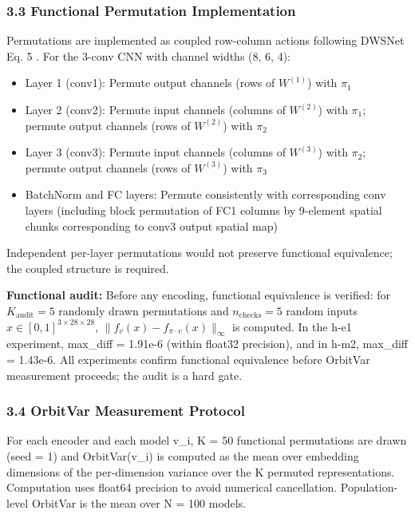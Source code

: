 \subsubsection{3.3 Functional Permutation Implementation}

Permutations are implemented as coupled row-column actions following DWSNet Eq. 5 \citep{Navon2023Equivariant}. For the 3-conv CNN with channel widths (8, 6, 4):

\begin{itemize}
\item Layer 1 (conv1): Permute output channels (rows of $W^{(1)}$) with $\pi_1$
\item Layer 2 (conv2): Permute input channels (columns of $W^{(2)}$) with $\pi_1$; permute output channels (rows of $W^{(2)}$) with $\pi_2$
\item Layer 3 (conv3): Permute input channels (columns of $W^{(3)}$) with $\pi_2$; permute output channels (rows of $W^{(3)}$) with $\pi_3$
\item BatchNorm and FC layers: Permute consistently with corresponding conv layers (including block permutation of FC1 columns by 9-element spatial chunks corresponding to conv3 output spatial map)
\end{itemize}

Independent per-layer permutations would not preserve functional equivalence; the coupled structure is required.

\textbf{Functional audit:} Before any encoding, functional equivalence is verified: for $K_\text{audit} = 5$ randomly drawn permutations and $n_\text{checks} = 5$ random inputs $x \in [0,1]^{3\times 28\times 28}$, $\|f_v(x) - f_{\pi \cdot v}(x)\|_\infty$ is computed. In the h-e1 experiment, max\_diff = 1.91e-6 (within float32 precision), and in h-m2, max\_diff = 1.43e-6. All experiments confirm functional equivalence before OrbitVar measurement proceeds; the audit is a hard gate.

\subsubsection{3.4 OrbitVar Measurement Protocol}

For each encoder and each model v\_i, K = 50 functional permutations are drawn (seed = 1) and OrbitVar(v\_i) is computed as the mean over embedding dimensions of the per-dimension variance over the K permuted representations. Computation uses float64 precision to avoid numerical cancellation. Population-level OrbitVar is the mean over N = 100 models.


